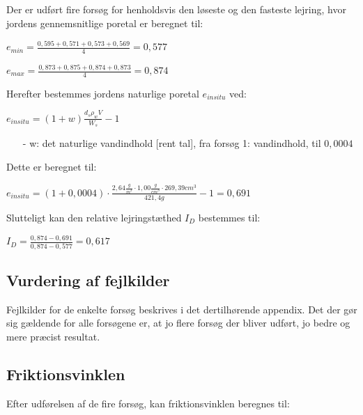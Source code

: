 Der er udført fire forsøg for henholdsvis den løseste og den fasteste lejring, hvor jordens gennemsnitlige poretal er beregnet til:

\begin{center}
	$e_{min} = \frac{0,\!595 + 0,\!571 + 0,\!573 + 0,\!569}{4} = 0,\!577$
\end{center}

\begin{center}
	$e_{max} = \frac{0,\!873 + 0,\!875 + 0,\!874 + 0,\!873}{4} = 0,\!874$
\end{center}

Herefter bestemmes jordens naturlige poretal $e_{in situ}$ ved:

\begin{center}
	$e_{in situ} = (1 + w) \frac{d_s  \rho_w  V}{W_s} - 1$
\end{center}

\begin{itemize}
	\item[-] w: det naturlige vandindhold [rent tal], fra forsøg 1: vandindhold, til $0,\!0004$ 
\end{itemize}

Dette er beregnet til:

\begin{center}
	$e_{in situ} = (1+0,\!0004) \cdot \frac{2,\!64 \frac{g}{m^3} \cdot 1,\!00 \frac{g}{cm^3} \cdot 269,\!39 cm^3}{421,\!4 g} - 1 = 0,\!691$
\end{center}

Slutteligt kan den relative lejringstæthed $I_D$ bestemmes til:

\begin{center}
	$I_D = \frac{0,\!874 - 0,\!691}{0,\!874 - 0,\!577} = 0,\!617$
\end{center}

\subsection{Vurdering af fejlkilder}
Fejlkilder for de enkelte forsøg beskrives i det dertilhørende appendix. Det der gør sig gældende for alle forsøgene er, at jo flere forsøg der bliver udført, jo bedre og mere præcist resultat. 

\subsection{Friktionsvinklen}
Efter udførelsen af de fire forsøg, kan friktionsvinklen beregnes til:

